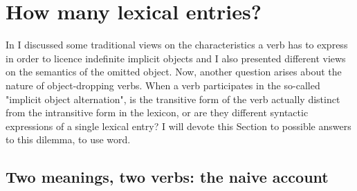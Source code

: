 \section{How many lexical entries?} 

In  I discussed some traditional views on the characteristics a verb has to express in order to licence indefinite implicit objects and I also presented different views on the semantics of the omitted object. Now, another question arises about the nature of object-dropping verbs. When a verb participates in the so-called "implicit object alternation", is the transitive form of the verb actually distinct from the intransitive form in the lexicon, or are they different syntactic expressions of a single lexical entry? I will devote this Section to possible answers to this dilemma, to use  word.


\subsection{Two meanings, two verbs: the naive account} 

